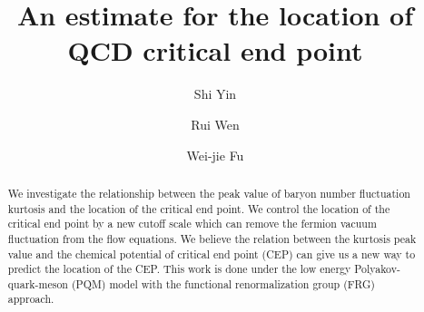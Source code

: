 \documentclass[%
reprint,
superscriptaddress,
showpacs,preprintnumbers,
 amsmath,amssymb,
 aps,
prl,
]{revtex4-1}
\begin{document}
\preprint{}

\title{An estimate for the location of QCD critical end point
}

\author{Shi Yin}

\author{Rui Wen}

\author{Wei-jie Fu}


\begin{abstract}
We investigate the relationship between the peak value of baryon number fluctuation kurtosis and the location of the critical end point. We control the location of the critical end point by a new cutoff scale which can remove the fermion vacuum fluctuation from the flow equations. We believe the relation between the kurtosis peak value and the chemical potential of critical end point (CEP) can give us a new way to predict the location of the CEP. This work is done under the low energy Polyakov-quark-meson (PQM) model with the functional renormalization group (FRG) approach.
\end{abstract}
\maketitle
\end{document}
